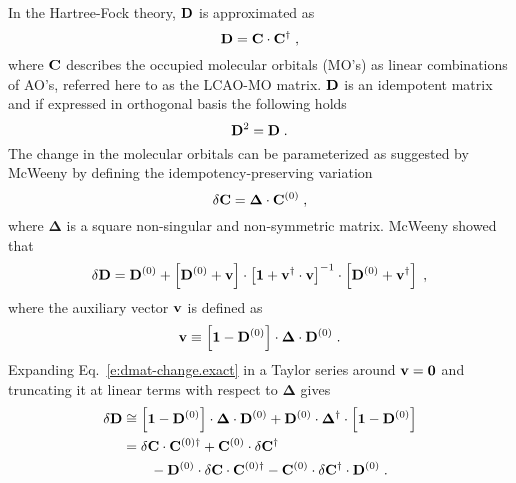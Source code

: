 \documentclass[aip,jcp,preprint,amsmath,amssymb,floatfix]{revtex4-1}
\newcommand{\BM}[1]{\bm{#1}}
\begin{document}
In the Hartree\hyp{}Fock theory,\cite{Roothaan.RevModPhys.1951} ${\bf D}$ is approximated as
%
\begin{equation}
 {\bf D} = {\bf C} \cdot {\bf C}^\dagger \;,
\end{equation}
%
where ${\bf C}$ describes the occupied molecular orbitals (MO's) as linear combinations
of AO's, referred here to as the LCAO-MO matrix.
${\bf D}$ is an idempotent matrix and if expressed in orthogonal basis the following holds
%
\begin{equation}
 {\bf D}^2 = {\bf D} \;.
\end{equation}
%
The change in the molecular orbitals can be parameterized as suggested by McWeeny\cite{McWeeny.RevModPhys.1960}
by defining the idempotency\hyp{}preserving variation
%
\begin{equation}
 \delta {\bf C} = {\BM\Delta} \cdot {\bf C}^{(0)} \;,
\end{equation}
%
where $\BM\Delta$ is a square non\hyp{}singular and non\hyp{}symmetric matrix.
McWeeny showed that
%
\begin{equation} \label{e:dmat-change.exact}
 \delta {\bf D} =  {\bf D}^{(0)} + \left[ {\bf D}^{(0)} + {\bf v} \right] \cdot
                                   \left[ {\bf 1} + {\bf v}^\dagger \cdot {\bf v} \right]^{-1} \cdot
                                   \left[ {\bf D}^{(0)} + {\bf v}^\dagger \right] \;,
\end{equation}
%
where the auxiliary vector ${\bf v}$ is defined as
%
\begin{equation}
 {\bf v} \equiv \left[ {\bf 1} - {\bf D}^{(0)} \right] \cdot {\BM\Delta} \cdot {\bf D}^{(0)}  \;.
\end{equation}
%
Expanding Eq.~\eqref{e:dmat-change.exact} in a Taylor series around ${\bf v}={\bf 0}$ and
truncating it at linear terms with respect to ${\BM\Delta}$ gives
%
\begin{subequations} 
 \begin{align}
 \delta {\bf D} &\cong \left[ {\bf 1} - {\bf D}^{(0)} \right] \cdot {\BM\Delta} \cdot {\bf D}^{(0)} + 
                        {\bf D}^{(0)} \cdot {\BM\Delta}^\dagger \cdot \left[ {\bf 1} - {\bf D}^{(0)} \right]  
 \label{e:dD-1} \\  &= 
  \delta {\bf C} \cdot {\bf C}^{(0)\dagger} + {\bf C}^{(0)} \cdot \delta {\bf C}^\dagger \nonumber \\
           &\qquad - {\bf D}^{(0)} \cdot \delta {\bf C} \cdot {\bf C}^{{(0)}\dagger} 
                   - {\bf C}^{(0)} \cdot \delta {\bf C}^\dagger \cdot {\bf D}^{(0)}  \;.
 \label{e:dD-2}
 \end{align}
\end{subequations}
\end{document}

